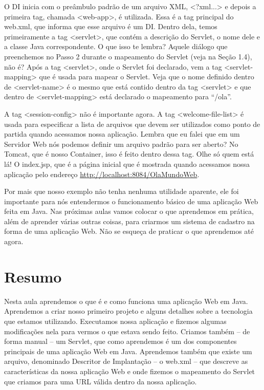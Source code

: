 O DI inicia com o preâmbulo padrão de um arquivo XML, <?xml...> e depois a primeira tag, chamada <web-app>, é utilizada. Essa é a tag principal do web.xml, que informa que esse arquivo é um DI. Dentro dela, temos primeiramente a tag <servlet>, que contém a descrição do Servlet, o nome dele e a classe Java correspondente. O que isso te lembra? Aquele diálogo que preenchemos no Passo 2 durante o mapeamento do Servlet (veja na Seção 1.4), não é? Após a tag <servlet>, onde o Servlet foi declarado, vem a tag <servlet-mapping> que é usada para mapear o Servlet. Veja que o nome definido dentro de <servlet-name> é o mesmo que está contido dentro da tag <servlet> e que dentro de <servlet-mapping> está declarado o mapeamento para ``/ola''.

A tag <session-config> não é importante agora. A tag <welcome-file-list> é usada para especificar a lista de arquivos que devem ser utilizados como ponto de partida quando acessamos nossa aplicação. Lembra que eu falei que em um Servidor Web nós podemos definir um arquivo padrão para ser aberto? No Tomcat, que é nosso Container, isso é feito dentro dessa tag. Olhe só quem está lá! O index.jsp, que é a página inicial que é mostrada quando acessamos nossa aplicação pelo endereço \url{http://localhost:8084/OlaMundoWeb}.

Por mais que nosso exemplo não tenha nenhuma utilidade aparente, ele foi importante para nós entendermos o funcionamento básico de uma aplicação Web feita em Java. Nas próximas aulas vamos colocar o que aprendemos em prática, além de aprender várias outras coisas, para criarmos um sistema de cadastro na forma de uma aplicação Web. Não se esqueça de praticar o que aprendemos até agora. 


\section{Resumo}

Nesta aula aprendemos o que é e como funciona uma aplicação Web em Java. Aprendemos a criar nosso primeiro projeto e alguns detalhes sobre a tecnologia que estamos utilizando. Executamos nossa aplicação e fizemos algumas modificações nela para vermos o que estava sendo feito. Criamos também – de forma manual – um Servlet, que como aprendemos é um dos componentes principais de uma aplicação Web em Java. Aprendemos também que existe um arquivo, denominado Descritor de Implantação – o web.xml – que descreve as características da nossa aplicação Web e onde fizemos o mapeamento do Servlet que criamos para uma URL válida dentro da nossa aplicação.


